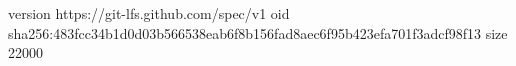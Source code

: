 version https://git-lfs.github.com/spec/v1
oid sha256:483fcc34b1d0d03b566538eab6f8b156fad8aec6f95b423efa701f3adcf98f13
size 22000
